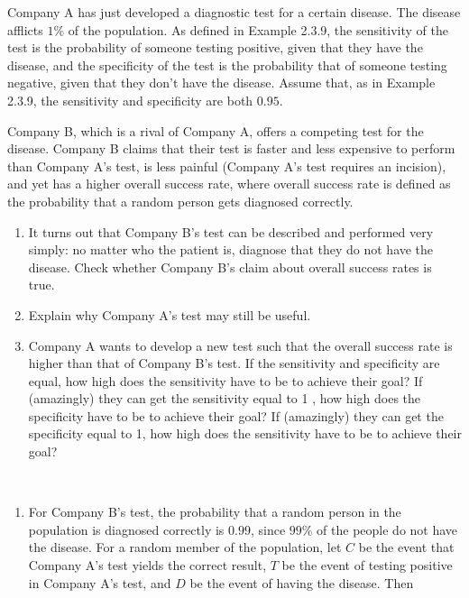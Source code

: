 

\setcounter{theorem}{8}
\begin{exercise}[BH.2.13]
  Company A has just developed a diagnostic test for a certain disease. The disease afflicts $1 \%$ of the population. As defined in Example 2.3.9, the sensitivity of the test is the probability of someone testing positive, given that they have the disease, and the specificity of the test is the probability that of someone testing negative, given that they don't have the disease. Assume that, as in Example 2.3.9, the sensitivity and specificity are both $0.95$.
	
	Company B, which is a rival of Company A, offers a competing test for the disease. Company B claims that their test is faster and less expensive to perform than Company A's test, is less painful (Company A's test requires an incision), and yet has a higher overall success rate, where overall success rate is defined as the probability that a random person gets diagnosed correctly.
	\begin{enumerate}
		\item It turns out that Company B's test can be described and performed very simply: no matter who the patient is, diagnose that they do not have the disease. Check whether Company B's claim about overall success rates is true.
		\item Explain why Company A's test may still be useful.
		\item Company A wants to develop a new test such that the overall success rate is higher than that of Company B's test. If the sensitivity and specificity are equal, how high does the sensitivity have to be to achieve their goal? If (amazingly) they can get the sensitivity equal to 1 , how high does the specificity have to be to achieve their goal? If (amazingly) they can get the specificity equal to 1, how high does the sensitivity have to be to achieve their goal?
	\end{enumerate}  
	\begin{solution}~
		\begin{enumerate}
			\item For Company B's test, the probability that a random person in the population is diagnosed correctly is $0.99$, since $99 \%$ of the people do not have the disease. For a random member of the population, let $C$ be the event that Company A's test yields the correct result, $T$ be the event of testing positive in Company A's test, and $D$ be the event of having the disease. Then
			$$
			\begin{aligned}

\end{aligned}$$
\end{enumerate}
\end{solution}
\end{exercise}
